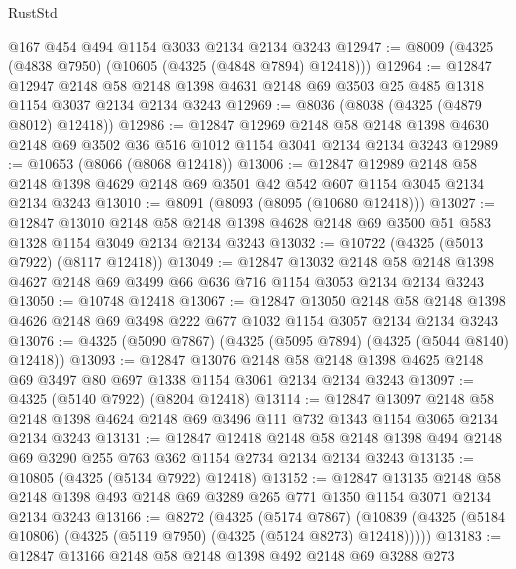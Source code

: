 \begin{lexlean}{RustStd}
\begin{coremodule}
    @167
    @454
    @494
    @1154
    @3033
    @2134
    @2134
    @3243
@12947 := @8009 (@4325 (@4838 @7950) (@10605 (@4325 (@4848 @7894) @12418)))
@12964 := @12847
    @12947
    @2148
    @58
    @2148
    @1398
    @4631
    @2148
    @69
    @3503
    @25
    @485
    @1318
    @1154
    @3037
    @2134
    @2134
    @3243
@12969 := @8036 (@8038 (@4325 (@4879 @8012) @12418))
@12986 := @12847
    @12969
    @2148
    @58
    @2148
    @1398
    @4630
    @2148
    @69
    @3502
    @36
    @516
    @1012
    @1154
    @3041
    @2134
    @2134
    @3243
@12989 := @10653 (@8066 (@8068 @12418))
@13006 := @12847
    @12989
    @2148
    @58
    @2148
    @1398
    @4629
    @2148
    @69
    @3501
    @42
    @542
    @607
    @1154
    @3045
    @2134
    @2134
    @3243
@13010 := @8091 (@8093 (@8095 (@10680 @12418)))
@13027 := @12847
    @13010
    @2148
    @58
    @2148
    @1398
    @4628
    @2148
    @69
    @3500
    @51
    @583
    @1328
    @1154
    @3049
    @2134
    @2134
    @3243
@13032 := @10722 (@4325 (@5013 @7922) (@8117 @12418))
@13049 := @12847
    @13032
    @2148
    @58
    @2148
    @1398
    @4627
    @2148
    @69
    @3499
    @66
    @636
    @716
    @1154
    @3053
    @2134
    @2134
    @3243
@13050 := @10748 @12418
@13067 := @12847
    @13050
    @2148
    @58
    @2148
    @1398
    @4626
    @2148
    @69
    @3498
    @222
    @677
    @1032
    @1154
    @3057
    @2134
    @2134
    @3243
@13076 := @4325 (@5090 @7867) (@4325 (@5095 @7894) (@4325 (@5044 @8140) @12418))
@13093 := @12847
    @13076
    @2148
    @58
    @2148
    @1398
    @4625
    @2148
    @69
    @3497
    @80
    @697
    @1338
    @1154
    @3061
    @2134
    @2134
    @3243
@13097 := @4325 (@5140 @7922) (@8204 @12418)
@13114 := @12847
    @13097
    @2148
    @58
    @2148
    @1398
    @4624
    @2148
    @69
    @3496
    @111
    @732
    @1343
    @1154
    @3065
    @2134
    @2134
    @3243
@13131 := @12847
    @12418
    @2148
    @58
    @2148
    @1398
    @494
    @2148
    @69
    @3290
    @255
    @763
    @362
    @1154
    @2734
    @2134
    @2134
    @3243
@13135 := @10805 (@4325 (@5134 @7922) @12418)
@13152 := @12847
    @13135
    @2148
    @58
    @2148
    @1398
    @493
    @2148
    @69
    @3289
    @265
    @771
    @1350
    @1154
    @3071
    @2134
    @2134
    @3243
@13166 := @8272
    (@4325
      (@5174 @7867)
      (@10839 (@4325 (@5184 @10806) (@4325 (@5119 @7950) (@4325 (@5124 @8273) @12418)))))
@13183 := @12847
    @13166
    @2148
    @58
    @2148
    @1398
    @492
    @2148
    @69
    @3288
    @273

\end{coremodule}
\end{lexlean}

